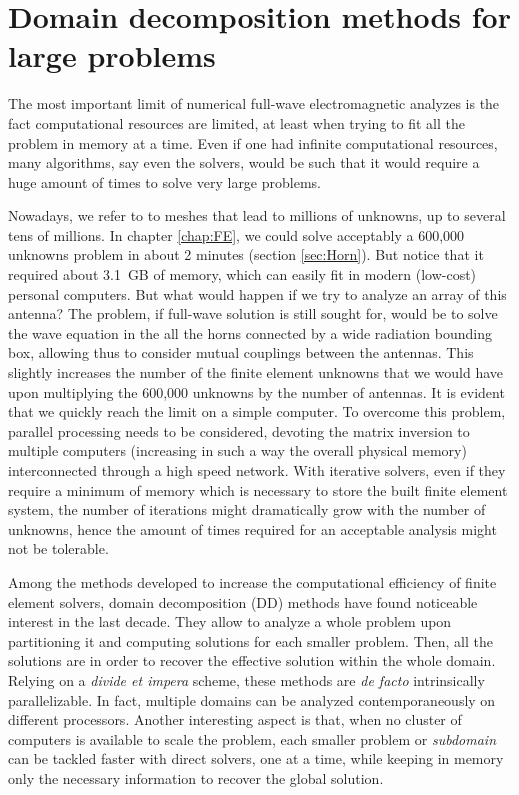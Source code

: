 \graphicspath{{img/ch2/}}
\chapter[Domain decomposition methods]{Domain decomposition methods for large  problems} \label{chap:DD}

The most important limit of numerical full-wave electromagnetic analyzes is the fact computational resources are limited, at least when trying to fit all the problem in memory at a time. Even if one had infinite computational resources, many algorithms, say even the solvers, would be such that it would require a huge amount of times to solve very large problems. 

Nowadays, we refer to  to meshes that lead to millions of unknowns, up to several tens of millions. In chapter \ref{chap:FE}, we could solve acceptably a 600,000 unknowns problem in about 2 minutes (section \ref{sec:Horn}). But notice that it required about 3.1~GB of memory, which can easily fit in modern (low-cost) personal computers. But what would happen if we try to analyze an array of this antenna? The problem, if full-wave solution is still sought for, would be to solve the wave equation in the all the horns connected by a wide radiation bounding box, allowing thus to consider mutual couplings between the antennas. This slightly increases the number of the finite element unknowns that we would have upon multiplying the 600,000 unknowns by the number of antennas. It is evident that we quickly reach the limit on a simple computer. To overcome this problem, parallel processing needs to be considered, devoting the matrix inversion to multiple computers (increasing in such a way the overall physical memory) interconnected through a high speed network. With iterative solvers, even if they require a minimum of memory which is necessary to store the built finite element system, the number of iterations might dramatically grow with the number of unknowns, hence the amount of times required for an acceptable analysis might not be tolerable.

Among the methods developed to increase the computational efficiency of finite element solvers, domain decomposition (DD) methods have found noticeable interest in the last decade.  They allow to analyze a whole problem upon partitioning it and computing solutions for each smaller problem. Then, all the solutions are  in order to recover the effective solution within the whole domain. Relying on a \textit{divide et impera} scheme, these methods are \textit{de facto} intrinsically parallelizable. In fact, multiple domains can be analyzed contemporaneously on different processors. Another interesting aspect is that, when no cluster of computers is available to scale the problem, each smaller problem or \textit{subdomain} can be tackled faster with direct solvers, one at a time, while keeping in memory only the necessary information to recover the global solution. 

